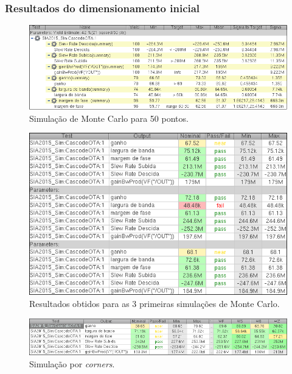 \documentclass[11pt]{article}
\numberwithin{equation}{section}
\begin{document}
\subsubsection{Resultados do dimensionamento inicial} 

\begin{figure}[H]
	\centering
	\includegraphics[keepaspectratio=true, scale=0.65]{exps/MonteCarlo_50pt_Antigo}
	\vspace{-0.5em}
	\caption{Simulação de Monte Carlo para 50 pontos.}
	\vspace{-0.8em}
\end{figure} 

\begin{figure}[H]
	\centering
	\includegraphics[keepaspectratio=true, scale=0.65]{exps/MonteCarlo_3pt_Antigo}
	\vspace{-0.5em}
	\caption{Resultados obtidos para as 3 primeiras simulações de Monte Carlo.}
	\vspace{-0.8em}
\end{figure} 

\begin{figure}[H]
	\centering
	\includegraphics[keepaspectratio=true, scale=0.65]{exps/Corners_Antigo}
	\vspace{-0.5em}
	\caption{Simulação por \textit{corners}.}
	\vspace{-0.8em}
\end{figure} 
\end{document}
